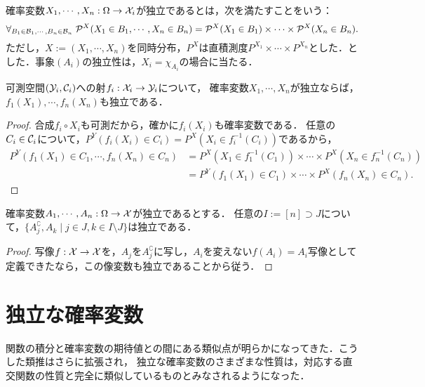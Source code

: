 \documentclass[uplatex,dvipdfmx]{jsreport}
\begin{document}
\begin{definition}[independent]\label{def-independentness-of-random-variables}
    確率変数$X_1,\cdots,X_n:\Omega\to\mathcal{X}_i$が独立であるとは，次を満たすことをいう：
    \[\forall_{B_1\in\mathcal{B}_1,\cdots,B_n\in\mathcal{B}_n}\;\mathcal{P}^X(X_1\in B_1,\cdots,X_n\in B_n)=\mathcal{P}^X(X_1\in B_1)\times\cdots\times\mathcal{P}^X(X_n\in B_n).\]
    ただし，$X:=(X_1,\cdots,X_n)$を同時分布，$P^X$は直積測度$P^{X_1}\times\cdots\times P^{X_n}$とした．とした．事象$(A_i)$の独立性は，$X_i=\chi_{A_i}$の場合に当たる．
\end{definition}

\begin{proposition}[可測関数は独立性を保つ]\label{prop-measurable-functions-perserve-independentness}
    可測空間$(\mathcal{Y}_i,\mathcal{C}_i)$への射$f_i:\mathcal{X}_i\to\mathcal{Y}_i$について，
    確率変数$X_1,\cdots,X_n$が独立ならば，$f_1(X_1),\cdots,f_n(X_n)$も独立である．
\end{proposition}
\begin{proof}
    合成$f_i\circ X_i$も可測だから，確かに$f_i(X_i)$も確率変数である．
    任意の$C_i\in\mathcal{C}_i$について，$P^Y(f_i(X_i)\in C_i)=P^X(X_i\in f^{-1}_i(C_i))$であるから，
    \begin{align*}
        P^Y(f_1(X_1)\in C_1,\cdots,f_n(X_n)\in C_n)&=P^X(X_1\in f^{-1}_1(C_1))\times\cdots\times P^X(X_n\in f^{-1}_n(C_n))\\
        &=P^Y(f_1(X_1)\in C_1)\times\cdots\times P^X(f_n(X_n)\in C_n).
    \end{align*}
\end{proof}

\begin{proposition}
    確率変数$A_1,\cdots,A_n:\Omega\to\mathcal{X}$が独立であるとする．
    任意の$I:=[n]\supset J$について，$\{A_j^\complement,A_k\mid j\in J,k\in I\setminus J\}$は独立である．
\end{proposition}
\begin{proof}
    写像$f:\mathcal{X}\to\mathcal{X}$を，$A_j$を$A_j^\complement$に写し，$A_i$を変えない$f(A_i)=A_i$写像として定義できたなら，この像変数も独立であることから従う．
\end{proof}

\section{独立な確率変数}

\begin{tcolorbox}[colframe=ForestGreen, colback=ForestGreen!10!white,breakable,colbacktitle=ForestGreen!40!white,coltitle=black,fonttitle=\bfseries\sffamily,
title=確率変数が独立のとき，作用素に種々の関手性が生じる]
    関数の積分と確率変数の期待値との間にある類似点が明らかになってきた．こうした類推はさらに拡張され，
    独立な確率変数のさまざまな性質は，対応する直交関数の性質と完全に類似しているものとみなされるようになった\cite{Kolmogorov}．
\end{tcolorbox}
\end{document}
